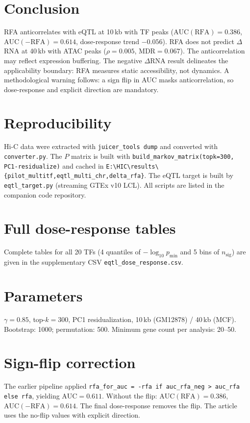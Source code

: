 \documentclass[11pt,a4paper]{article}
\begin{document}
\section{Conclusion}
RFA anticorrelates with eQTL at 10\,kb with TF peaks ($\mathrm{AUC}(\mathrm{RFA})=0.386$, $\mathrm{AUC}(-\mathrm{RFA})=0.614$, dose-response trend $-0.056$). RFA does not predict $\Delta$RNA at 40\,kb with ATAC peaks ($\rho=0.005$, MDR$=0.067$). The anticorrelation may reflect expression buffering. The negative $\Delta$RNA result delineates the applicability boundary: RFA measures static accessibility, not dynamics. A methodological warning follows: a sign flip in AUC masks anticorrelation, so dose-response and explicit direction are mandatory.

\appendix
\section{Reproducibility}
Hi-C data were extracted with \texttt{juicer\_tools dump} and converted with \texttt{converter.py}. The $P$ matrix is built with \texttt{build\_markov\_matrix(topk=300, PC1-residualize)} and cached in \texttt{E:\textbackslash HIC\textbackslash results\textbackslash\{pilot\_multitf,eqtl\_multi\_chr,delta\_rfa\}}. The eQTL target is built by \texttt{eqtl\_target.py} (streaming GTEx v10 LCL). All scripts are listed in the companion code repository.

\section{Full dose-response tables}
Complete tables for all 20 TFs (4 quantiles of $-\log_{10} p_{\min}$ and 5 bins of $n_{\mathrm{sig}}$) are given in the supplementary CSV \texttt{eqtl\_dose\_response.csv}.

\section{Parameters}
$\gamma=0.85$, top-$k=300$, PC1 residualization, 10\,kb (GM12878) / 40\,kb (MCF). Bootstrap: 1000; permutation: 500. Minimum gene count per analysis: 20--50.

\section{Sign-flip correction}
The earlier pipeline applied \texttt{rfa\_for\_auc = -rfa if auc\_rfa\_neg > auc\_rfa else rfa}, yielding $\mathrm{AUC}=0.611$. Without the flip: $\mathrm{AUC}(\mathrm{RFA})=0.386$, $\mathrm{AUC}(-\mathrm{RFA})=0.614$. The final dose-response removes the flip. The article uses the no-flip values with explicit direction.
\end{document}
